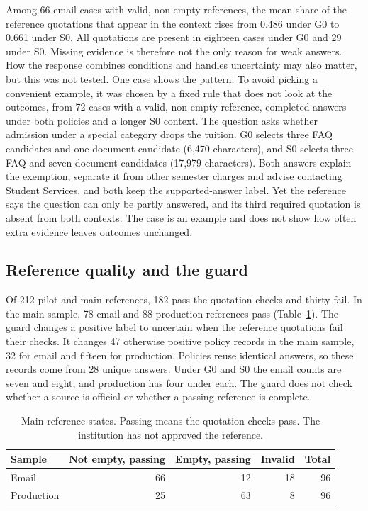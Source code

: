 Among 66 email cases with valid, non-empty references, the mean share of the reference quotations that appear in the context rises from 0.486 under G0 to 0.661 under S0. All quotations are present in eighteen cases under G0 and 29 under S0. Missing evidence is therefore not the only reason for weak answers. How the response combines conditions and handles uncertainty may also matter, but this was not tested. One case shows the pattern. To avoid picking a convenient example, it was chosen by a fixed rule that does not look at the outcomes, from 72 cases with a valid, non-empty reference, completed answers under both policies and a longer S0 context. The question asks whether admission under a special category drops the tuition. G0 selects three FAQ candidates and one document candidate (6,470 characters), and S0 selects three FAQ and seven document candidates (17,979 characters). Both answers explain the exemption, separate it from other semester charges and advise contacting Student Services, and both keep the supported-answer label. Yet the reference says the question can only be partly answered, and its third required quotation is absent from both contexts. The case is an example and does not show how often extra evidence leaves outcomes unchanged.

\subsection{Reference quality and the guard}
\label{sec:reference-quality}

Of 212 pilot and main references, 182 pass the quotation checks and thirty fail. In the main sample, 78 email and 88 production references pass (Table~\ref{tab:reference-states}). The guard changes a positive label to uncertain when the reference quotations fail their checks. It changes 47 otherwise positive policy records in the main sample, 32 for email and fifteen for production. Policies reuse identical answers, so these records come from 28 unique answers. Under G0 and S0 the email counts are seven and eight, and production has four under each. The guard does not check whether a source is official or whether a passing reference is complete.

\begin{table}[htbp]
\centering
\caption[Main reference states]{Main reference states. Passing means the quotation checks pass. The institution has not approved the reference.}
\label{tab:reference-states}
\begin{tabular}{lrrrr}
\toprule
Sample & Not empty, passing & Empty, passing & Invalid & Total \\
\midrule
Email & 66 & 12 & 18 & 96 \\
Production & 25 & 63 & 8 & 96 \\
\bottomrule
\end{tabular}
\end{table}

